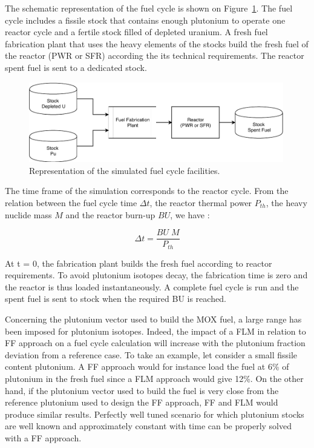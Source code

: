 The schematic representation of the fuel cycle is shown on Figure~\ref{fig:FuelCycle}. The fuel cycle includes a fissile stock that contains enough plutonium to operate one reactor cycle and a fertile stock filled of depleted uranium. A fresh fuel fabrication plant that uses the heavy elements of the stocks build the fresh fuel of the reactor (PWR or SFR) according the its technical requirements. The reactor spent fuel is sent to a dedicated stock.

\begin{figure}[h]
    \begin{center}
        \includegraphics[width = 0.99\textwidth]{FIG/FuelCycleDiagram.pdf}
        \caption{Representation of the simulated fuel cycle facilities.}
        \label{fig:FuelCycle}
    \end{center}
\end{figure}

The time frame of the simulation corresponds to the reactor cycle. From the relation between the fuel cycle time $\Delta t$, the reactor thermal power $P_{th}$, the heavy nuclide mass $M$ and the reactor burn-up $BU$, we have : 

\begin{equation}
    \Delta t = \frac{BU \; M}{P_{th}}
\end{equation}

At t = 0, the fabrication plant builds the fresh fuel according to reactor requirements. To avoid plutonium isotopes decay, the fabrication time is zero and the reactor is thus loaded instantaneously. A complete fuel cycle is run and the spent fuel is sent to stock when the required BU is reached.

Concerning the plutonium vector used to build the MOX fuel, a large range has been imposed for plutonium isotopes. Indeed, the impact of a \gls{FLM} in relation to \gls{FF} approach on a fuel cycle calculation will increase with the plutonium fraction deviation from a reference case. To take an example, let consider a small fissile content plutonium. A \gls{FF} approach would for instance load the fuel at 6\% of plutonium in the fresh fuel since a \gls{FLM} approach would give 12\%. On the other hand, if the plutonium vector used to build the fuel is very close from the reference plutonium used to design the \gls{FF} approach, \gls{FF} and \gls{FLM} would produce similar results. Perfectly well tuned scenario for which plutonium stocks are well known and approximately constant with time can be properly solved with a \gls{FF} approach. 

